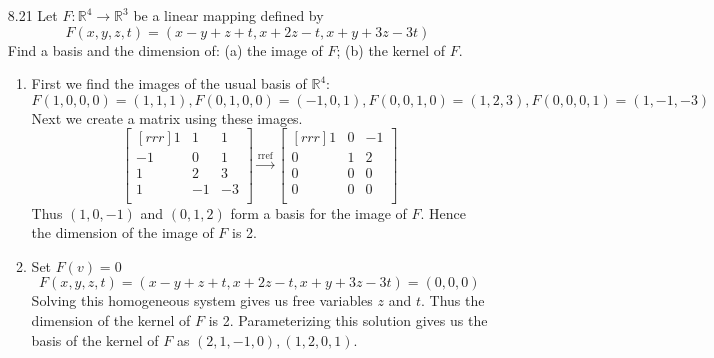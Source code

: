 \documentclass[12pt]{article}
\theoremstyle{plain}
\theoremstyle{definition}
\theoremstyle{plain}
\begin{document}
\begin{enumerate}
\item[8.21]Let $F: \mathbb{R}^4\rightarrow\mathbb{R}^3$ be a linear mapping defined by
\[ F(x,y,z,t)=(x-y+z+t,x+2z-t,x+y+3z-3t) \]
Find a basis and the dimension of: (a) the image of $F$; (b) the kernel of $F$.
	\begin{enumerate}
	\item First we find the images of the usual basis of $\mathbb{R}^4$:\\
		$F(1,0,0,0)=(1,1,1),F(0,1,0,0)=(-1,0,1),F(0,0,1,0)=(1,2,3), F(0,0,0,1)=(1,-1,-3)$\\
		Next we create a matrix using these images.
		\[ \begin{bmatrix}[rrr]1&1&1\\-1&0&1\\1&2&3\\1&-1&-3\\\end{bmatrix} \xrightarrow[]{\mathrm{rref}} \begin{bmatrix}[rrr]1&0&-1\\0&1&2\\0&0&0\\0&0&0\\\end{bmatrix} \]
		Thus $(1,0,-1)$ and $(0,1,2)$ form a basis for the image of $F$. Hence the dimension of the image of $F$ is 2.
	\item Set $F(v)=0$
		\[ F(x,y,z,t)=(x-y+z+t,x+2z-t,x+y+3z-3t)=(0,0,0) \]
		Solving this homogeneous system gives us free variables $z$ and $t$. Thus the dimension of the kernel of $F$ is 2. Parameterizing this solution gives us the basis of the kernel of $F$ as $(2,1,-1,0),(1,2,0,1)$.
	\end{enumerate}
	

\end{enumerate}
\end{document}
